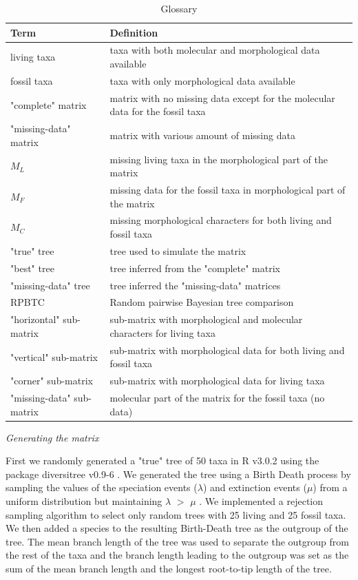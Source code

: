 \documentclass[12pt,letterpaper]{article}
\renewcommand{\subsection}[1]{%
\bigskip
\begin{center}
\begin{large}
\normalfont\itshape #1
\end{large}
\end{center}}
\begin{document}
\begin{table}[ht]
\caption{Glossary}
\centering
\begin{tabular}{p{5cm} p{9cm}}
\hline
\hfill Term & Definition \\[0.5ex]
\hline
\hfill living taxa & taxa with both molecular and morphological data available \\[1.5ex]
\hfill fossil taxa & taxa with only morphological data available \\[1.5ex]
\hfill "complete" matrix & matrix with no missing data except for the molecular data for the fossil taxa \\[1.5ex]
\hfill "missing-data" matrix & matrix with various amount of missing data \\[1.5ex]
\hfill $M_{L}$ & missing living taxa in the morphological part of the matrix \\[1.5ex]
\hfill $M_{F}$ & missing data for the fossil taxa in morphological part of the matrix \\[1.5ex]
\hfill $M_{C}$ & missing morphological characters for both living and fossil taxa \\[1.5ex]
\hfill "true" tree & tree used to simulate the matrix \\[1.5ex]
\hfill "best" tree & tree inferred from the "complete" matrix \\[1.5ex]
\hfill "missing-data" tree & tree inferred the "missing-data" matrices \\[1.5ex]
\hfill RPBTC & Random pairwise Bayesian tree comparison \\[1.5ex]
\hfill "horizontal" sub-matrix & sub-matrix with morphological and molecular characters for living taxa \\[1.5ex]
\hfill "vertical" sub-matrix & sub-matrix with morphological data for both living and fossil taxa \\[1.5ex]
\hfill "corner" sub-matrix & sub-matrix with morphological data for living taxa \\[1.5ex]
\hfill "missing-data" sub-matrix & molecular part of the matrix for the fossil taxa (no data) \\
\end{tabular}
\label{Tab_glossary}
\end{table}

\subsection{Generating the matrix}
First we randomly generated a "true" tree of 50 taxa in R v3.0.2 \citep{R302} using the package diversitree v0.9-6 \citep{fitzjohndiversitree2012}.
We generated the tree using a Birth Death process by sampling the values of the speciation events ($\lambda$) and extinction events ($\mu$) from a uniform distribution but maintaining $\lambda$ $>$ $\mu$ \citep{paradistime-dependent2011}.
We implemented a rejection sampling algorithm to select only random trees with 25 living and 25 fossil taxa.
We then added a species to the resulting Birth-Death tree as the outgroup of the tree.
The mean branch length of the tree was used to separate the outgroup from the rest of the taxa and the branch length leading to the outgroup was set as the sum of the mean branch length and the longest root-to-tip length of the tree.
\end{document}
